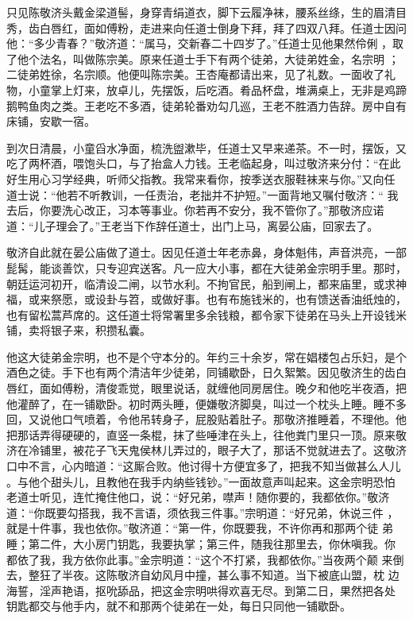 只见陈敬济头戴金梁道髻，身穿青绢道衣，脚下云履净袜，腰系丝绦，生的眉清目
秀，齿白唇红，面如傅粉，走进来向任道士倒身下拜，拜了四双八拜。任道士因问
他：“多少青春？”敬济道：“属马，交新春二十四岁了。”任道士见他果然伶俐
，取了他个法名，叫做陈宗美。原来任道士手下有两个徒弟，大徒弟姓金，名宗明
；二徒弟姓徐，名宗顺。他便叫陈宗美。王杏庵都请出来，见了礼数。一面收了礼
物，小童掌上灯来，放卓儿，先摆饭，后吃酒。肴品杯盘，堆满桌上，无非是鸡蹄
鹅鸭鱼肉之类。王老吃不多酒，徒弟轮番劝勾几巡，王老不胜酒力告辞。房中自有
床铺，安歇一宿。

到次日清晨，小童舀水净面，梳洗盥漱毕，任道士又早来递茶。不一时，摆饭，又
吃了两杯酒，喂饱头口，与了抬盒人力钱。王老临起身，叫过敬济来分付：“在此
好生用心习学经典，听师父指教。我常来看你，按季送衣服鞋袜来与你。”又向任
道士说：“他若不听教训，一任责治，老拙并不护短。”一面背地又嘱付敬济：“
我去后，你要洗心改正，习本等事业。你若再不安分，我不管你了。”那敬济应诺
道：“儿子理会了。”王老当下作辞任道士，出门上马，离晏公庙，回家去了。

敬济自此就在晏公庙做了道士。因见任道士年老赤鼻，身体魁伟，声音洪亮，一部
髭髯，能谈善饮，只专迎宾送客。凡一应大小事，都在大徒弟金宗明手里。那时，
朝廷运河初开，临清设二闸，以节水利。不拘官民，船到闸上，都来庙里，或求神
福，或来祭愿，或设卦与笤，或做好事。也有布施钱米的，也有馈送香油纸烛的，
也有留松蒿芦席的。这任道士将常署里多余钱粮，都令家下徒弟在马头上开设钱米
铺，卖将银子来，积攒私囊。

他这大徒弟金宗明，也不是个守本分的。年约三十余岁，常在娼楼包占乐妇，是个
酒色之徒。手下也有两个清洁年少徒弟，同铺歇卧，日久絮繁。因见敬济生的齿白
唇红，面如傅粉，清俊乖觉，眼里说话，就缠他同房居住。晚夕和他吃半夜酒，把
他灌醉了，在一铺歇卧。初时两头睡，便嫌敬济脚臭，叫过一个枕头上睡。睡不多
回，又说他口气喷着，令他吊转身子，屁股贴着肚子。那敬济推睡着，不理他。他
把那话弄得硬硬的，直竖一条棍，抹了些唾津在头上，往他粪门里只一顶。原来敬
济在冷铺里，被花子飞天鬼侯林儿弄过的，眼子大了，那话不觉就进去了。这敬济
口中不言，心内暗道：“这厮合败。他讨得十方便宜多了，把我不知当做甚么人儿
。与他个甜头儿，且教他在我手内纳些钱钞。”一面故意声叫起来。这金宗明恐怕
老道士听见，连忙掩住他口，说：“好兄弟，噤声！随你要的，我都依你。”敬济
道：“你既要勾搭我，我不言语，须依我三件事。”宗明道：“好兄弟，休说三件
，就是十件事，我也依你。”敬济道：“第一件，你既要我，不许你再和那两个徒
弟睡；第二件，大小房门钥匙，我要执掌；第三件，随我往那里去，你休嗔我。你
都依了我，我方依你此事。”金宗明道：“这个不打紧，我都依你。”当夜两个颠
来倒去，整狂了半夜。这陈敬济自幼风月中撞，甚么事不知道。当下被底山盟，枕
边海誓，淫声艳语，抠吮舔品，把这金宗明哄得欢喜无尽。到第二日，果然把各处
钥匙都交与他手内，就不和那两个徒弟在一处，每日只同他一铺歇卧。

